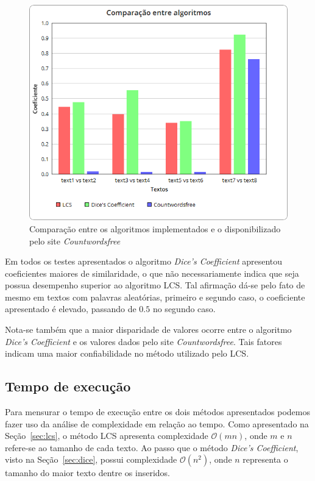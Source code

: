 \documentclass[12pt]{article}
\begin{document}
\begin{figure}[H]
    \centering
    \includegraphics[scale=0.7]{img/diferenca.png}
    \caption{Comparação entre os algoritmos implementados e o disponibilizado pelo site \textit{Countwordsfree}}
    \label{fig:diferenca}
\end{figure}

Em todos os testes apresentados o algoritmo \textit{Dice's Coefficient} apresentou coeficientes maiores de similaridade, o que não necessariamente indica que seja possua desempenho superior ao algoritmo LCS. Tal afirmação dá-se pelo fato de mesmo em textos com palavras aleatórias, primeiro e segundo caso, o coeficiente apresentado é elevado, passando de $0.5$ no segundo caso.

Nota-se também que a maior disparidade de valores ocorre entre o algoritmo \textit{Dice's Coefficient} e os valores dados pelo site \textit{Countwordsfree}. Tais fatores indicam uma maior confiabilidade no método utilizado pelo LCS.

\subsection{Tempo de execução}

Para mensurar o tempo de execução entre os dois métodos apresentados podemos fazer uso da análise de complexidade em relação ao tempo. Como apresentado na Seção~\ref{sec:lcs}, o método LCS apresenta complexidade $\mathcal{O}(mn)$, onde $m$ e $n$ refere-se ao tamanho de cada texto. Ao passo que o método \textit{Dice's Coefficient}, visto na Seção~\ref{sec:dice}, possui complexidade $\mathcal{O}(n^2)$, onde $n$ representa o tamanho do maior texto dentre os inseridos. 
\end{document}
